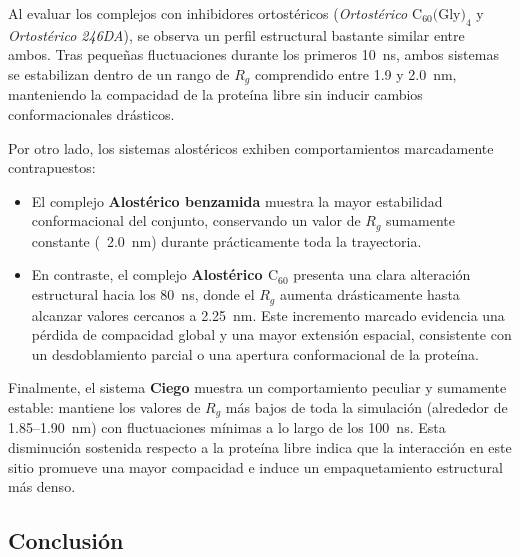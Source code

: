 Al evaluar los complejos con inhibidores ortostéricos (\textit{Ortostérico $\text{C}_{60}\text{(Gly)}_4$} y \textit{Ortostérico 246DA}), se observa un perfil estructural bastante similar entre ambos. Tras pequeñas fluctuaciones durante los primeros 10~ns, ambos sistemas se estabilizan dentro de un rango de $R_g$ comprendido entre 1.9 y 2.0~nm, manteniendo la compacidad de la proteína libre sin inducir cambios conformacionales drásticos.

Por otro lado, los sistemas alostéricos exhiben comportamientos marcadamente contrapuestos:
\begin{itemize}
    \item El complejo \textbf{Alostérico benzamida} muestra la mayor estabilidad conformacional del conjunto, conservando un valor de $R_g$ sumamente constante (~2.0~nm) durante prácticamente toda la trayectoria.
    \item En contraste, el complejo \textbf{Alostérico $\text{C}_{60}$} presenta una clara alteración estructural hacia los 80~ns, donde el $R_g$ aumenta drásticamente hasta alcanzar valores cercanos a 2.25~nm. Este incremento marcado evidencia una pérdida de compacidad global y una mayor extensión espacial, consistente con un desdoblamiento parcial o una apertura conformacional de la proteína.
\end{itemize}

Finalmente, el sistema \textbf{Ciego} muestra un comportamiento peculiar y sumamente estable: mantiene los valores de $R_g$ más bajos de toda la simulación (alrededor de 1.85--1.90~nm) con fluctuaciones mínimas a lo largo de los 100~ns. Esta disminución sostenida respecto a la proteína libre indica que la interacción en este sitio promueve una mayor compacidad e induce un empaquetamiento estructural más denso.

\subsection{Conclusión}


